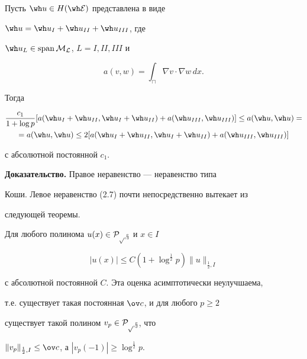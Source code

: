 \begin{lems}


Пусть $\wh u\in H(\E)$ представлена в виде


$\wh u=\wh u_I+\wh u_{II}+\wh u_{III}$, где


$\wh u_L\in\Span\cal M_L$, $L=I,II,III$ и


$$


a(v,w)=\int_\sqcap\nabla v\cdot\nabla w \,dx.


$$


Тогда


\begin{multline}


\frac{c_1}{1+\log p}[a(\wh u_I+\wh u_{II},\wh u_I+


\wh u_{II})+a(\wh u_{III},\wh u_{III})]\le a(\wh u,\wh u)=\\


=a(\wh u,\wh u)


\le2[a(\wh u_I+\wh u_{II},\wh u_I+\wh u_{II})+


a(\wh u_{III},\wh u_{III})]


\label{2.7}


\end{multline}


с абсолютной постоянной $c_1$.


\end{lems}





{\bf Доказательство.} Правое неравенство --- неравенство типа


Коши. Левое неравенство (2.7) почти непосредственно вытекает из


следующей теоремы.





\begin{thms}


Для любого полинома $u(x)\in\cal P_{p,x}$ и $x\in I$


\begin{equation}


|u(x)|\le C(1+\log^{\frac{1}{2}}p)\|u\|_{\frac{1}{2},I}


\label{2.9}


\end{equation}


с абсолютной постоянной $C$. Эта оценка асимптотически неулучшаема,


т.е. существует такая постоянная $\ov c$, и для любого $p\ge2$


существует такой полином $v_p\in\cal P_{p,x}$, что


$\|v_p\|_{\frac{1}{2},I}\le\ov c$, а $|v_p(-1)|\ge\log^{\frac{1}{2}}p$.


\end{thms}





